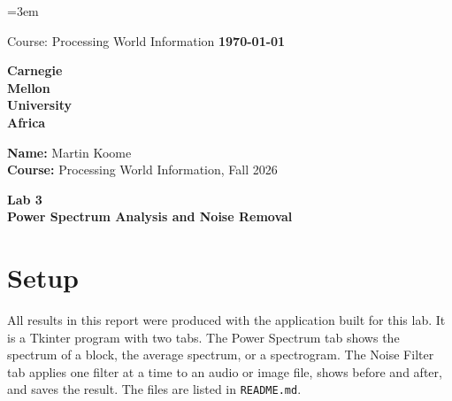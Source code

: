 \documentclass[12pt, letterpaper]{article}
\begin{document}
\emergencystretch=3em
\begin{titlepage}
  \thispagestyle{empty}
  \noindent
  {\small Course: Processing World Information} \hfill {\textbf{\today}}
  \vspace{3cm}
  \begin{flushleft}
    {\fontsize{55}{50}\selectfont \textbf{\textcolor{cmured}{Carnegie}}}\\[4mm]
    {\fontsize{55}{50}\selectfont \textbf{\textcolor{cmured}{Mellon}}}\\[4mm]
    {\fontsize{55}{50}\selectfont \textbf{\textcolor{cmured}{University}}}\\[2mm]
    {\fontsize{45}{50}\selectfont \textbf{\textcolor{cmugrey}{Africa}}}
  \end{flushleft}
  \vfill
  \begin{flushleft}
    \textbf{Name:} Martin Koome \\
    \vspace{0.2cm}
    \textbf{Course:} Processing World Information, Fall 2026
  \end{flushleft}
  \vspace{1.5cm}
  \begin{center}
    \large \textbf{Lab 3} \\[0.5cm]
    \large \textbf{Power Spectrum Analysis and Noise Removal}
  \end{center}
  \vspace{2cm}
\end{titlepage}

\section{Setup}

All results in this report were produced with the application built for this lab. It is a Tkinter program with two tabs. The Power Spectrum tab shows the spectrum of a block, the average spectrum, or a spectrogram. The Noise Filter tab applies one filter at a time to an audio or image file, shows before and after, and saves the result. The files are listed in \texttt{README.md}.
\end{document}
